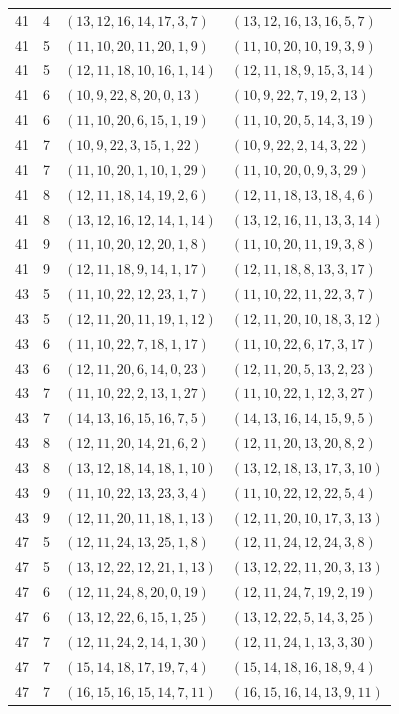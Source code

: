 \documentclass[11pt,a4paper]{article}
\theoremstyle{definition}
\numberwithin{equation}{section}
\begin{document}
\begin{longtable}{rrll}
41&4&$(13,12,16,14,17,3,7)$&$(13,12,16,13,16,5,7)$\\
41&5&$(11,10,20,11,20,1,9)$&$(11,10,20,10,19,3,9)$\\
41&5&$(12,11,18,10,16,1,14)$&$(12,11,18,9,15,3,14)$\\
41&6&$(10,9,22,8,20,0,13)$&$(10,9,22,7,19,2,13)$\\
41&6&$(11,10,20,6,15,1,19)$&$(11,10,20,5,14,3,19)$\\
41&7&$(10,9,22,3,15,1,22)$&$(10,9,22,2,14,3,22)$\\
41&7&$(11,10,20,1,10,1,29)$&$(11,10,20,0,9,3,29)$\\
41&8&$(12,11,18,14,19,2,6)$&$(12,11,18,13,18,4,6)$\\
41&8&$(13,12,16,12,14,1,14)$&$(13,12,16,11,13,3,14)$\\
41&9&$(11,10,20,12,20,1,8)$&$(11,10,20,11,19,3,8)$\\
41&9&$(12,11,18,9,14,1,17)$&$(12,11,18,8,13,3,17)$\\
43&5&$(11,10,22,12,23,1,7)$&$(11,10,22,11,22,3,7)$\\
43&5&$(12,11,20,11,19,1,12)$&$(12,11,20,10,18,3,12)$\\
43&6&$(11,10,22,7,18,1,17)$&$(11,10,22,6,17,3,17)$\\
43&6&$(12,11,20,6,14,0,23)$&$(12,11,20,5,13,2,23)$\\
43&7&$(11,10,22,2,13,1,27)$&$(11,10,22,1,12,3,27)$\\
43&7&$(14,13,16,15,16,7,5)$&$(14,13,16,14,15,9,5)$\\
43&8&$(12,11,20,14,21,6,2)$&$(12,11,20,13,20,8,2)$\\
43&8&$(13,12,18,14,18,1,10)$&$(13,12,18,13,17,3,10)$\\
43&9&$(11,10,22,13,23,3,4)$&$(11,10,22,12,22,5,4)$\\
43&9&$(12,11,20,11,18,1,13)$&$(12,11,20,10,17,3,13)$\\
47&5&$(12,11,24,13,25,1,8)$&$(12,11,24,12,24,3,8)$\\
47&5&$(13,12,22,12,21,1,13)$&$(13,12,22,11,20,3,13)$\\
47&6&$(12,11,24,8,20,0,19)$&$(12,11,24,7,19,2,19)$\\
47&6&$(13,12,22,6,15,1,25)$&$(13,12,22,5,14,3,25)$\\
47&7&$(12,11,24,2,14,1,30)$&$(12,11,24,1,13,3,30)$\\
47&7&$(15,14,18,17,19,7,4)$&$(15,14,18,16,18,9,4)$\\
47&7&$(16,15,16,15,14,7,11)$&$(16,15,16,14,13,9,11)$\\

\end{longtable}
\end{document}
